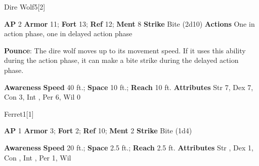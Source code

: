 \begin{monsection}{Dire Wolf}{5}[2]
\vspace{-1em}\vspace{-1em}
\begin{spellcontent}
\begin{spelltargetinginfo}
{\textbf{AP} 2}
\pari \textbf{Armor} 11;
\textbf{Fort} 13;
\textbf{Ref} 12;
\textbf{Ment} 8
\pari \textbf{Strike} Bite  (2d10)
\pari \textbf{Actions} One in action phase, one in delayed action phase
\end{spelltargetinginfo}
\begin{spelleffects}
\pari
\textbf{Pounce}:
The dire wolf moves up to its movement speed.
If it uses this ability during the action phase, it can make a bite strike during the delayed action phase.
\end{spelleffects}
\end{spellcontent}
\begin{spellsubcontent}
\begin{spellfooter}
\pari \textbf{Awareness} 
\pari \textbf{Speed} 40 ft.;
\textbf{Space} 10 ft.;
\textbf{Reach} 10 ft.
\pari \textbf{Attributes}
Str 7,
Dex 7,
Con 3,
Int ,
Per 6,
Wil 0
\end{spellfooter}
\end{spellsubcontent}
\end{monsection}
\begin{monsection}{Ferret}{1}[1]
\vspace{-1em}\vspace{-1em}
\begin{spellcontent}
\begin{spelltargetinginfo}
{\textbf{AP} 1}
\pari \textbf{Armor} 3;
\textbf{Fort} 2;
\textbf{Ref} 10;
\textbf{Ment} 2
\pari \textbf{Strike} Bite  (1d4)
\end{spelltargetinginfo}
\end{spellcontent}
\begin{spellsubcontent}
\begin{spellfooter}
\pari \textbf{Awareness} 
\pari \textbf{Speed} 20 ft.;
\textbf{Space} 2.5 ft.;
\textbf{Reach} 2.5 ft.
\pari \textbf{Attributes}
Str ,
Dex 1,
Con ,
Int ,
Per 1,
Wil 
\end{spellfooter}
\end{spellsubcontent}
\end{monsection}
